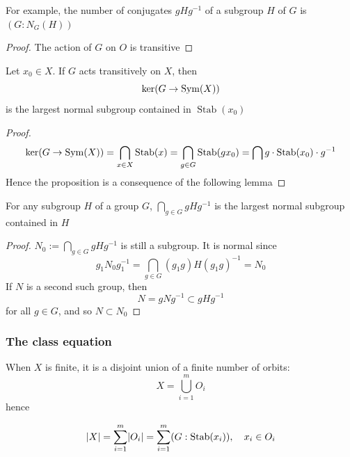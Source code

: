 \documentclass[11pt]{article}
\DeclareMathOperator{\Stab}{Stab}
\begin{document}
For example, the number of conjugates \(gHg^{-1}\) of a subgroup \(H\) of \(G\)
is \((G:N_G(H))\)

\begin{proof}
The action of \(G\) on \(O\) is transitive
\end{proof}

\begin{proposition}[]
Let \(x_0\in X\). If \(G\) acts transitively on \(X\), then
\begin{equation*}
\ker(G\to\operatorname{Sym}(X))
\end{equation*}
is the largest normal subgroup contained in \(\Stab(x_0)\)
\end{proposition}

\begin{proof}
\begin{equation*}
\ker(G\to\Sym(X))=\bigcap_{x\in X}\Stab(x)=\bigcap_{g\in G}\Stab(gx_0)=\bigcap g\cdot\Stab(x_0)\cdot g^{-1}
\end{equation*}
Hence the proposition is a consequence of the following lemma
\end{proof}

\begin{lemma}[]
For any subgroup \(H\) of a group \(G\), \(\bigcap_{g\in G}gHg^{-1}\) is the largest normal subgroup
contained in \(H\)
\end{lemma}

\begin{proof}
\(N_0:=\bigcap_{g\in G}gHg^{-1}\) is still a subgroup. It is normal since
\begin{equation*}
g_1N_0g_1^{-1}=\bigcap_{g\in G}(g_1g)H(g_1g)^{-1}=N_0
\end{equation*}
If \(N\) is a second such group, then
\begin{equation*}
N=gNg^{-1}\subset gHg^{-1}
\end{equation*}
for all \(g\in G\), and so \(N\subset N_0\)
\end{proof}

\subsubsection{The class equation}
\label{sec:org84d9df3}
When \(X\) is finite, it is a disjoint union of a finite number of orbits:
\begin{equation*}
X=\bigcup_{i=1}^mO_i
\end{equation*}
hence
\begin{proposition}[]
\begin{equation*}
\abs{X}=\sum_{i=1}^m\abs{O_i}=\sum_{i=1}^m(G:\Stab(x_i)),\quad x_i\in O_i
\end{equation*}
\end{proposition}
\end{document}
